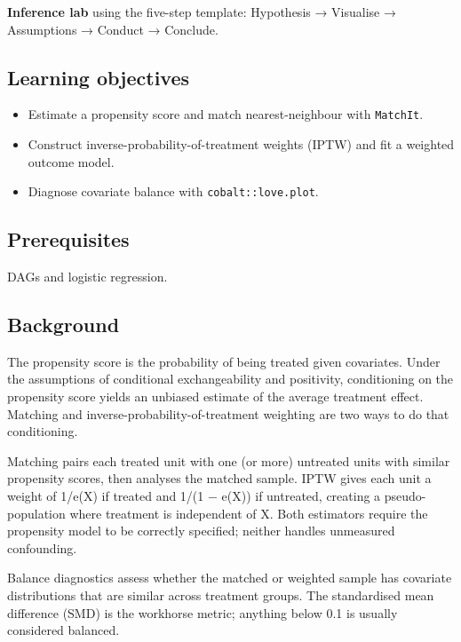 \documentclass[
]{article}
\author{}
\date{\vspace{-2.5em}}
\providecommand{\tightlist}{%
  \setlength{\itemsep}{0pt}\setlength{\parskip}{0pt}}
\begin{document}
\textbf{Inference lab} using the five-step template: Hypothesis →
Visualise → Assumptions → Conduct → Conclude.

\subsection{Learning objectives}\label{learning-objectives}

\begin{itemize}
\tightlist
\item
  Estimate a propensity score and match nearest-neighbour with
  \texttt{MatchIt}.
\item
  Construct inverse-probability-of-treatment weights (IPTW) and fit a
  weighted outcome model.
\item
  Diagnose covariate balance with \texttt{cobalt::love.plot}.
\end{itemize}

\subsection{Prerequisites}\label{prerequisites}

DAGs and logistic regression.

\subsection{Background}\label{background}

The propensity score is the probability of being treated given
covariates. Under the assumptions of conditional exchangeability and
positivity, conditioning on the propensity score yields an unbiased
estimate of the average treatment effect. Matching and
inverse-probability-of-treatment weighting are two ways to do that
conditioning.

Matching pairs each treated unit with one (or more) untreated units with
similar propensity scores, then analyses the matched sample. IPTW gives
each unit a weight of 1/e(X) if treated and 1/(1 − e(X)) if untreated,
creating a pseudo-population where treatment is independent of X. Both
estimators require the propensity model to be correctly specified;
neither handles unmeasured confounding.

Balance diagnostics assess whether the matched or weighted sample has
covariate distributions that are similar across treatment groups. The
standardised mean difference (SMD) is the workhorse metric; anything
below 0.1 is usually considered balanced.
\end{document}
